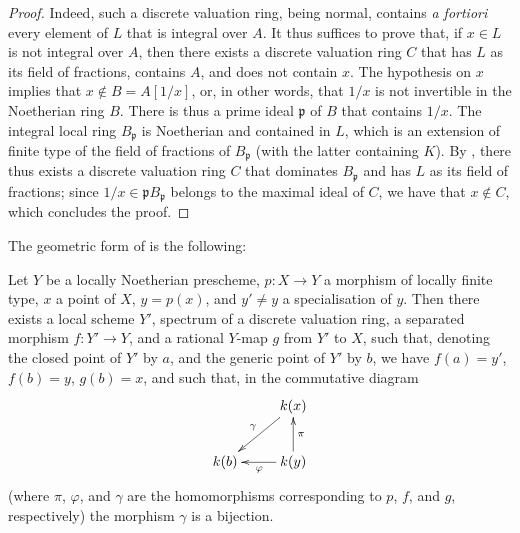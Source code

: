 \begin{proof}
\label{proof-II.7.1.8}
Indeed, such a discrete valuation ring, being normal, contains \emph{a fortiori} every element of $L$ that is integral over $A$.
It thus suffices to prove that, if $x\in L$ is not integral over $A$, then there exists a discrete valuation ring $C$ that has $L$ as its field of fractions, contains $A$, and does not contain $x$.
The hypothesis on $x$ implies that $x\not\in B=A[1/x]$, or, in other words, that $1/x$ is not invertible in the Noetherian ring $B$.
There is thus a prime ideal $\mathfrak{p}$ of $B$ that contains $1/x$.
The integral local ring $B_\mathfrak{p}$ is Noetherian and contained in $L$, which is an extension  of finite type of the field of fractions of $B_\mathfrak{p}$ (with the latter containing $K$).
By , there thus exists a discrete valuation ring $C$ that dominates $B_\mathfrak{p}$ and has $L$ as its field of fractions;
since $1/x\in\mathfrak{p}B_\mathfrak{p}$ belongs to the maximal ideal of $C$, we have that $x\not\in C$, which concludes the proof.
\end{proof}

The geometric form of  is the following:

\begin{proposition}[7.1.9]
\label{II.7.1.9}
Let $Y$ be a locally Noetherian prescheme, $p:X\to Y$ a morphism of locally finite type, $x$ a point of $X$, $y=p(x)$, and $y'\neq y$ a specialisation of $y$.
Then there exists a local scheme $Y'$, spectrum of a discrete valuation ring, a separated morphism $f:Y'\to Y$, and a rational $Y$-map $g$ from $Y'$ to $X$, such that, denoting the closed point of $Y'$ by $a$, and the generic point of $Y'$ by $b$, we have $f(a)=y'$, $f(b)=y$, $g(b)=x$, and such that, in the commutative diagram
\[
    \xymatrix{
        & \kres(x) \ar[dl]_{\gamma}
    \\  \kres(b)
        & \kres(y) \ar[u]_{\pi} \ar[l]^{\varphi}
    }
\]
(where $\pi$, $\varphi$, and $\gamma$ are the homomorphisms corresponding to $p$, $f$, and $g$, respectively) the morphism $\gamma$ is a bijection.
\end{proposition}






